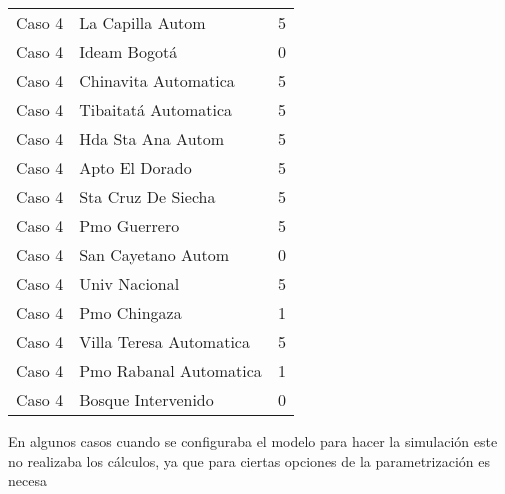 \begin{itemize}
\begin{longtable}{lll}
Caso 4 & La Capilla Autom  & 5 \\
Caso 4 & Ideam Bogotá  & 0 \\
Caso 4 & Chinavita Automatica  & 5 \\
Caso 4 & Tibaitatá Automatica  & 5 \\
Caso 4 & Hda Sta Ana Autom  & 5 \\
Caso 4 & Apto El Dorado  & 5 \\
Caso 4 & Sta Cruz De Siecha  & 5 \\
Caso 4 & Pmo Guerrero  & 5 \\
Caso 4 & San Cayetano Autom   & 0 \\
Caso 4 & Univ Nacional  & 5 \\
Caso 4 & Pmo Chingaza  & 1 \\
Caso 4 & Villa Teresa Automatica  & 5 \\
Caso 4 & Pmo Rabanal Automatica   & 1 \\
Caso 4 & Bosque Intervenido    & 0 \\

\end{longtable}

En algunos casos cuando se configuraba el modelo para hacer la simulación este no realizaba los cálculos, ya que para ciertas opciones de la parametrización es necesa


\end{itemize}
